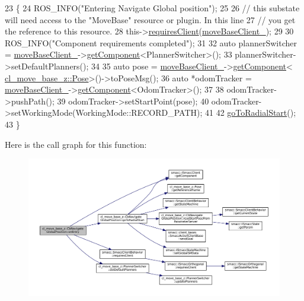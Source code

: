 \begin{DoxyCode}
23 \{
24     ROS\_INFO(\textcolor{stringliteral}{"Entering Navigate Global position"});
25 
26     \textcolor{comment}{// this substate will need access to the "MoveBase" resource or plugin. In this line}
27     \textcolor{comment}{// you get the reference to this resource.}
28     this->\hyperlink{classsmacc_1_1SmaccClientBehavior_a917f001e763a1059af337bf4e164f542}{requiresClient}(\hyperlink{classcl__move__base__z_1_1CbNavigateGlobalPosition_a460d6b43834cb52baa94d22cd3a6fd2b}{moveBaseClient\_});
29 
30     ROS\_INFO(\textcolor{stringliteral}{"Component requirements completed"});
31 
32     \textcolor{keyword}{auto} plannerSwitcher = \hyperlink{classcl__move__base__z_1_1CbNavigateGlobalPosition_a460d6b43834cb52baa94d22cd3a6fd2b}{moveBaseClient\_}->\hyperlink{classsmacc_1_1ISmaccClient_adef78db601749ca63c19e74a27cb88cc}{getComponent}<PlannerSwitcher>();
33     plannerSwitcher->setDefaultPlanners();
34 
35     \textcolor{keyword}{auto} pose = \hyperlink{classcl__move__base__z_1_1CbNavigateGlobalPosition_a460d6b43834cb52baa94d22cd3a6fd2b}{moveBaseClient\_}->\hyperlink{classsmacc_1_1ISmaccClient_adef78db601749ca63c19e74a27cb88cc}{getComponent}<
      \hyperlink{classcl__move__base__z_1_1Pose}{cl\_move\_base\_z::Pose}>()->toPoseMsg();
36     \textcolor{keyword}{auto} *odomTracker = \hyperlink{classcl__move__base__z_1_1CbNavigateGlobalPosition_a460d6b43834cb52baa94d22cd3a6fd2b}{moveBaseClient\_}->\hyperlink{classsmacc_1_1ISmaccClient_adef78db601749ca63c19e74a27cb88cc}{getComponent}<OdomTracker>();
37 
38     odomTracker->pushPath();
39     odomTracker->setStartPoint(pose);
40     odomTracker->setWorkingMode(WorkingMode::RECORD\_PATH);
41 
42     \hyperlink{classcl__move__base__z_1_1CbNavigateGlobalPosition_a489aaab9282dea9253fcf6b02e5f8aa4}{goToRadialStart}();
43 \}
\end{DoxyCode}
Here is the call graph for this function\+:
\nopagebreak
\begin{figure}[H]
\begin{center}
\leavevmode
\includegraphics[width=350pt]{classcl__move__base__z_1_1CbNavigateGlobalPosition_a66d8b0555ef2945bc108dcd5171be292_cgraph}
\end{center}
\end{figure}
